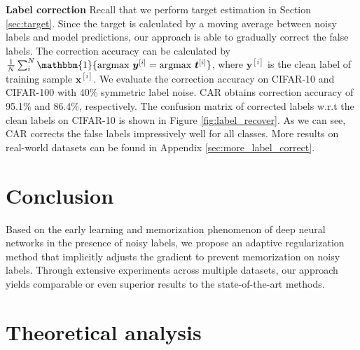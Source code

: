 \documentclass{article}
\begin{document}
\textbf{Label correction} Recall that we perform target estimation in Section \ref{sec:target}. Since the target is calculated by a moving average between noisy labels and model predictions, our approach is able to gradually correct the false labels. The correction accuracy can be calculated by $\frac{1}{N}\sum_{i}^{N}\mathbbm{1} \{\mathrm{argmax}\ \bm{y}^{[i]}=\mathrm{argmax}\ \bm{t}^{[i]}\}$, where $\bm{y}^{[i]}$ is the clean label of training sample $\bm{x}^{[i]}$. We evaluate the correction accuracy on CIFAR-10 and CIFAR-100 with 40\% symmetric label noise. CAR obtains correction accuracy of 95.1\% and 86.4\%, respectively. The confusion matrix of corrected labels w.r.t the clean labels on CIFAR-10 is shown in Figure \ref{fig:label_recover}. As we can see, CAR corrects the false labels impressively well for all classes. More results on real-world datasets can be found in Appendix \ref{sec:more_label_correct}.








\section{Conclusion}

Based on the early learning and memorization phenomenon of deep neural networks in the presence of noisy labels, we propose an adaptive regularization method that implicitly adjusts the gradient to prevent memorization on noisy labels. Through extensive experiments across multiple datasets, our approach yields comparable or even superior results to the state-of-the-art methods. 








\newpage









\appendix
\section{Theoretical analysis}
\setcounter{equation}{0}
\setcounter{lemma}{0}
\setcounter{theorem}{0}
\end{document}
